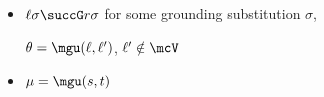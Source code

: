 
\begin{itemize}

        \item
            \( \ell\sigma\succG r\sigma \) for some grounding substitution \( \sigma \),

            \( \theta=\mgu(\ell,\ell') \),
            \( \ell'\notin\mcV \)

        \item
            \( \mu=\mgu(s,t) \)
    \end{itemize}